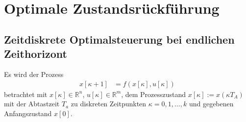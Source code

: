 \chapter{Optimale Zustandsrückführung}
\section{Zeitdiskrete Optimalsteuerung bei endlichen Zeithorizont}
Es wird der Prozess
\begin{align}
	x[\kappa + 1] & = f\left(x[\kappa], u[\kappa] \right)
\end{align}
betrachtet mit $x[\kappa]\in\mathbb{R}^n$, $u[\kappa]\in\mathbb{R}^m$, dem Prozesszustand $x[\kappa]:=x(\kappa T_A)$ mit der Abtastzeit $T_a$ zu
diskreten Zeitpunkten $\kappa=0,1,\ldots,k$ und gegebenen Anfangszustand $x[0]$.

